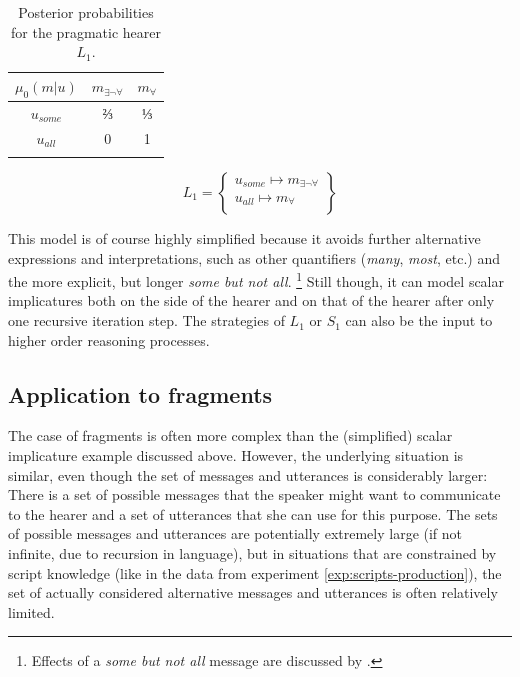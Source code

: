 \begin{table}
\begin{tabular}{c c c}
 \lsptoprule
 $\mu_0(m|u)$ & $m_{\exists\neg\forall}$ & $m_{\forall}$\\
\midrule
$u_{some}$ & ⅔ & ⅓ \\
$u_{all}$ & 0 & 1\\
\lspbottomrule
\end{tabular}
\caption{Posterior probabilities for the pragmatic hearer $L_1$.\label{tab:gt-si-l1}}
\end{table}

\begin{equation}
L_1 = \begin{Bmatrix} u_{some} \mapsto m_{\exists\neg\forall} \\
        u_{all} \mapsto m_{\forall}\\
       \end{Bmatrix}\label{eq:gt_l1}
\end{equation}




This model is of course highly simplified because it avoids further alternative expressions and interpretations, such as other quantifiers (\textit{many}, \textit{most}, etc.) and the more explicit, but longer \textit{some but not all}.%
%
\footnote{Effects of a \textit{some but not all} message are discussed by \citet[77, 127]{franke2009}.}\afterfn%
%
Still though, it can model scalar implicatures both on the side of the hearer and on that of the hearer after only one recursive iteration step. The strategies of $L_1$ or $S_1$ can also be the input to higher order reasoning processes.

\subsection{Application to fragments}
The case of fragments is often more complex than the (simplified) scalar implicature example discussed above. However, the underlying situation is similar, even though the set of messages and utterances is considerably larger: There is a set of possible messages that the speaker might want to communicate to the hearer and a set of utterances that she can use for this purpose. The sets of possible messages and utterances are potentially extremely large (if not infinite, due to recursion in language), but in situations that are constrained by script knowledge (like in the data from experiment \ref{exp:scripts-production}), the set of actually considered alternative messages and utterances is often relatively limited.

